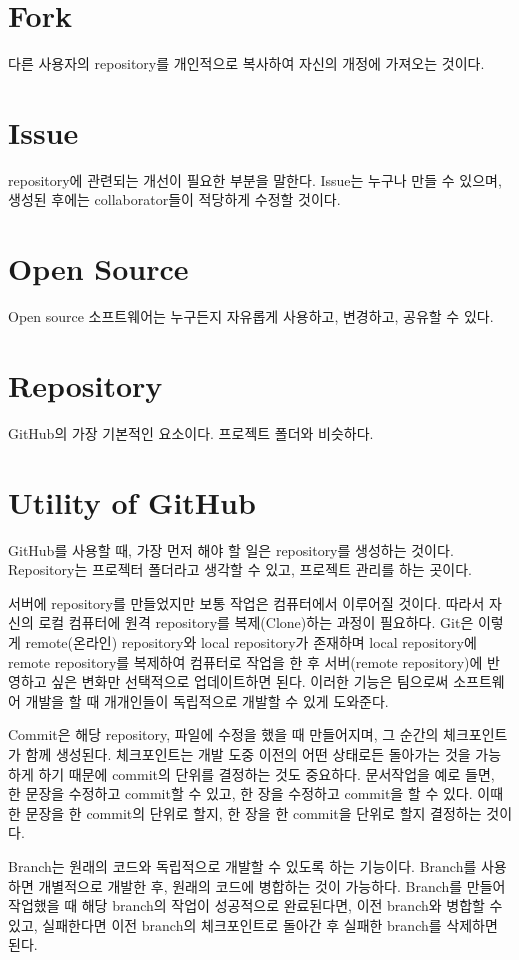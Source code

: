 \documentclass[a4paper, 11pt]{article}
\begin{document}
\section*{Fork}
다른 사용자의 repository를 개인적으로 복사하여 자신의 개정에 가져오는 것이다.

\section*{Issue}
repository에 관련되는 개선이 필요한 부분을 말한다. Issue는 누구나 만들 수 있으며, 생성된 후에는 collaborator들이 적당하게 수정할 것이다.

\section*{Open Source}
Open source 소프트웨어는 누구든지 자유롭게 사용하고, 변경하고, 공유할 수 있다.

\section*{Repository}
GitHub의 가장 기본적인 요소이다. 프로젝트 폴더와 비슷하다.

\section{Utility of GitHub}
GitHub를 사용할 때, 가장 먼저 해야 할 일은 repository를 생성하는 것이다. Repository는 프로젝터 폴더라고 생각할 수 있고, 프로젝트 관리를 하는 곳이다.

서버에 repository를 만들었지만 보통 작업은 컴퓨터에서 이루어질 것이다. 따라서 자신의 로컬 컴퓨터에 원격 repository를 복제(Clone)하는 과정이 필요하다. Git은 이렇게 remote(온라인) repository와 local repository가 존재하며 local repository에 remote repository를 복제하여 컴퓨터로 작업을 한 후 서버(remote repository)에 반영하고 싶은 변화만 선택적으로 업데이트하면 된다. 이러한 기능은 팀으로써 소프트웨어 개발을 할 때 개개인들이 독립적으로 개발할 수 있게 도와준다.

Commit은 해당 repository, 파일에 수정을 했을 때 만들어지며, 그 순간의 체크포인트가 함께 생성된다. 체크포인트는 개발 도중 이전의 어떤 상태로든 돌아가는 것을 가능하게 하기 때문에 commit의 단위를 결정하는 것도 중요하다. 문서작업을 예로 들면, 한 문장을 수정하고 commit할 수 있고, 한 장을 수정하고 commit을 할 수 있다. 이때 한 문장을 한 commit의 단위로 할지, 한 장을 한 commit을 단위로 할지 결정하는 것이다.

Branch는 원래의 코드와 독립적으로 개발할 수 있도록 하는 기능이다. Branch를 사용하면 개별적으로 개발한 후, 원래의 코드에 병합하는 것이 가능하다. Branch를 만들어 작업했을 때 해당 branch의 작업이 성공적으로 완료된다면, 이전 branch와 병합할 수 있고, 실패한다면 이전 branch의 체크포인트로 돌아간 후 실패한 branch를 삭제하면 된다.
\end{document}

